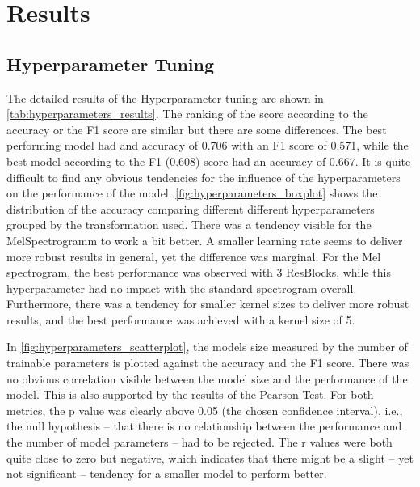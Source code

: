 


\section{Results}
\label{results}

\subsection{Hyperparameter Tuning}%

The detailed results of the Hyperparameter tuning are shown in \autoref{tab:hyperparameters_results}.
The ranking of the score according to the accuracy or the F1 score are similar but there are some differences.
The best performing model had and accuracy of 0.706 with an F1 score of 0.571, while 
the best model according to the F1 (0.608) score had an accuracy of 0.667.
It is quite difficult to find any obvious tendencies for the influence of the hyperparameters on the performance of the model.
\autoref{fig:hyperparameters_boxplot} shows the distribution of the accuracy comparing different different hyperparameters
grouped by the transformation used. There was a tendency visible for the MelSpectrogramm to work a bit better.
A smaller learning rate seems to deliver more robust results in general, yet the difference was marginal.
For the Mel spectrogram, the best performance was observed with 3 ResBlocks, while this hyperparameter had no impact with the standard spectrogram overall.
Furthermore, there was a tendency for smaller kernel sizes to deliver more robust results,
and the best performance was achieved with a kernel size of 5.



In \autoref{fig:hyperparameters_scatterplot}, the
models size measured by the number of trainable parameters is plotted against the accuracy and the F1 score.
There was no obvious correlation visible between the model size and the performance of the model.
This is also supported by the results of the Pearson Test. For both metrics, the p value was clearly above 0.05 
(the chosen confidence interval), i.e., the null hypothesis -- that there is no relationship between the performance and the number of model parameters -- had to be rejected.
The r values were both quite close to zero but negative, which indicates that there might be a slight -- yet not significant -- tendency for a smaller model to perform better.

